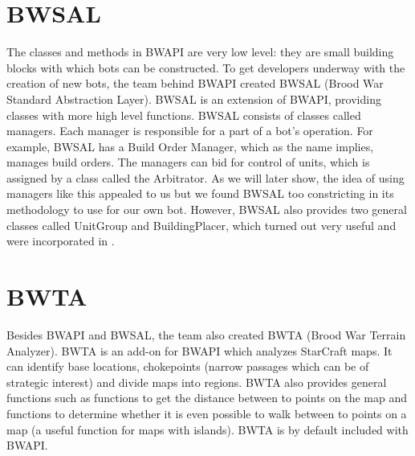\section{BWSAL}

The classes and methods in BWAPI are very low level: they are small building blocks with which bots can be constructed. To get developers underway with the creation of new bots, the team behind BWAPI created BWSAL (Brood War Standard Abstraction Layer). BWSAL is an extension of BWAPI, providing classes with more high level functions. BWSAL consists of classes called managers. Each manager is responsible for a part of a bot's operation. For example, BWSAL has a Build Order Manager, which as the name implies, manages build orders. The managers can bid for control of units, which is assigned by a class called the Arbitrator. As we will later show, the idea of using managers like this appealed to us but we found BWSAL too constricting in its methodology to use for our own bot. However, BWSAL also provides two general classes called UnitGroup and BuildingPlacer, which turned out very useful and were incorporated in \massexpand.

\section{BWTA}

Besides BWAPI and BWSAL, the team also created BWTA (Brood War Terrain Analyzer). BWTA is an add-on for BWAPI which analyzes StarCraft maps. It can identify base locations, chokepoints (narrow passages which can be of strategic interest) and divide maps into regions. BWTA also provides general functions such as functions to get the distance between to points on the map and functions to determine whether it is even possible to walk between to points on a map (a useful function for maps with islands). BWTA is by default included with BWAPI.